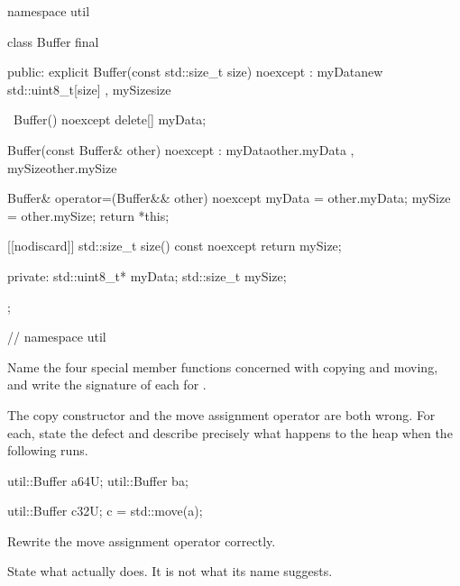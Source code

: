 \begin{cppcode}
namespace util
{
class Buffer final
{
public:
    explicit Buffer(const std::size_t size) noexcept
        : myData{new std::uint8_t[size]{}}
        , mySize{size}
    {}

    ~Buffer() noexcept { delete[] myData; }

    Buffer(const Buffer& other) noexcept
        : myData{other.myData}
        , mySize{other.mySize}
    {}

    Buffer& operator=(Buffer&& other) noexcept
    {
        myData = other.myData;
        mySize = other.mySize;
        return *this;
    }

    [[nodiscard]] std::size_t size() const noexcept { return mySize; }

private:
    std::uint8_t* myData;
    std::size_t mySize;
};
} // namespace util
\end{cppcode}

 Name the four special member functions concerned with copying and moving, and write the
signature of each for . 

 The copy constructor and the move assignment operator are both wrong. For each, state the
defect and describe precisely what happens to the heap when the following runs. 

\begin{cppcode}
util::Buffer a{64U};
util::Buffer b{a};

util::Buffer c{32U};
c = std::move(a);
\end{cppcode}

 Rewrite the move assignment operator correctly. 

 State what  actually does. It is not what its name suggests. 

\label{exa:q:5}

